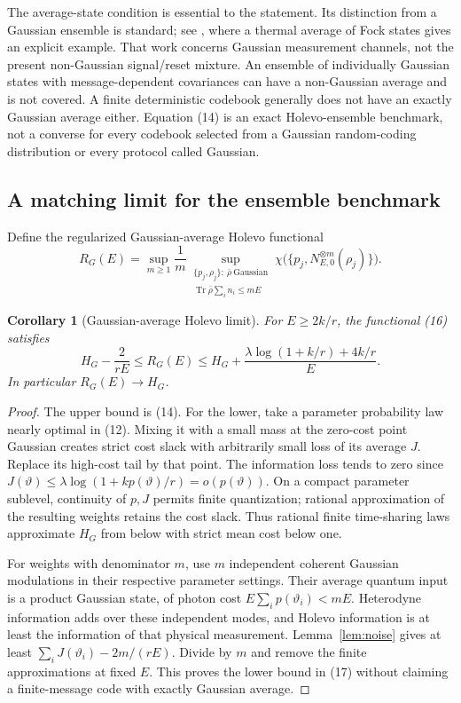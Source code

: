 \documentclass[11pt]{article}
\newtheorem{corollary}[theorem]{Corollary}
\newcommand{\Tr}{\operatorname{Tr}}
\begin{document}
The average-state condition is essential to the statement. Its
distinction from a Gaussian ensemble is standard; see
\cite[Remark 2]{holevoMeasurement}, where a thermal average of Fock
states gives an explicit example. That work concerns Gaussian measurement
channels, not the present non-Gaussian signal/reset mixture.
An ensemble of individually Gaussian states with message-dependent
covariances can have a non-Gaussian average and is not covered.
A finite deterministic codebook generally does not have an exactly
Gaussian average either. Equation (14) is an exact Holevo-ensemble
benchmark, not a converse for every codebook selected from a Gaussian
random-coding distribution or every protocol called Gaussian.

\subsection{A matching limit for the ensemble benchmark}

Define the regularized Gaussian-average Holevo functional
\[
 R_G(E)=\sup_{m\geq1}\frac1m
 \sup_{\substack{\{p_j,\rho_j\}:\ \bar\rho\ \mathrm{Gaussian}\\
                   \Tr\bar\rho\sum_i n_i\leq mE}}
 \chi\bigl(\{p_j,N_{E,0}^{\otimes m}(\rho_j)\}\bigr).        \tag{16}
\]
\begin{corollary}[Gaussian-average Holevo limit]\label{cor:gausslimit}
For \(E\geq2k/r\), the functional (16) satisfies
\[
 H_G-\frac{2}{rE}\leq R_G(E)
 \leq H_G+\frac{\lambda\log(1+k/r)+4k/r}{E}.                \tag{17}
\]
In particular \(R_G(E)\to H_G\).
\end{corollary}
\begin{proof}
The upper bound is (14). For the lower, take a parameter probability law
nearly optimal in (12). Mixing it with a small mass at the zero-cost
point Gaussian creates strict cost slack with arbitrarily small loss
of its average \(J\). Replace its high-cost tail by that point. The
information loss tends to zero since
\(J(\vartheta)\leq\lambda\log(1+kp(\vartheta)/r)=o(p(\vartheta))\).
On a compact parameter sublevel, continuity of \(p,J\) permits finite
quantization; rational approximation of the resulting weights retains
the cost slack. Thus rational finite time-sharing laws approximate
\(H_G\) from below with strict mean cost below one.

For weights with denominator \(m\), use \(m\) independent coherent
Gaussian modulations in their respective parameter settings. Their
average quantum input is a product Gaussian state, of photon cost
\(E\sum_i p(\vartheta_i)<mE\). Heterodyne information adds over these
independent modes, and Holevo information is at least the information
of that physical measurement. Lemma~\ref{lem:noise} gives at least
\(\sum_i J(\vartheta_i)-2m/(rE)\). Divide by \(m\) and remove the
finite approximations at fixed \(E\). This proves the lower bound
in (17) without claiming a finite-message code with exactly Gaussian
average.
\end{proof}
\end{document}
